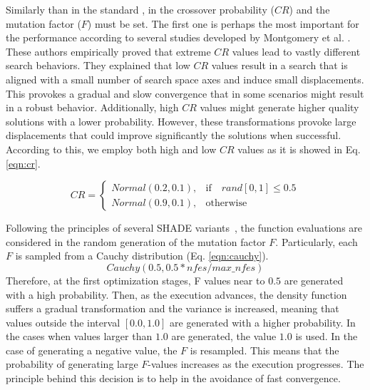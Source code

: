 %
Similarly than in the standard \DE{}, in \DEEDM{} the crossover probability ($CR$) and the mutation factor ($F$) must be set.
%
The first one is perhaps the most important for the performance according to several studies developed by Montgomery 
et al. \cite{montgomery2010analysis}.
%
These authors empirically proved that extreme $CR$ values lead to vastly different search behaviors.
%
They explained that low $CR$ values result in a search that is aligned with a small number of search space axes and
induce small displacements.
%
This provokes a gradual and slow convergence that in some scenarios might result in a robust behavior.
%
Additionally, high $CR$ values might generate higher quality solutions with a lower probability.
%
However, these transformations provoke large displacements that could improve significantly the solutions when successful.
%
According to this, we employ both high and low $CR$ values as it is showed in Eq. \ref{eqn:cr}.

\begin{equation} \label{eqn:cr}
CR = 
\begin{cases}
     Normal(0.2, 0.1),& \text{if} \quad rand[0,1] \leq 0.5  \\
     Normal(0.9, 0.1),              & \text{otherwise}
\end{cases}
\end{equation}

Following the principles of several SHADE variants~\cite{awad2016ensemble, brest2016shade}, the function evaluations are considered in the random generation of the mutation factor $F$.
%
Particularly, each $F$ is sampled from a Cauchy distribution (Eq. \ref{eqn:cauchy}).
\begin{equation}\label{eqn:cauchy}
 Cauchy(0.5, 0.5*nfes/max\_nfes)
\end{equation}
%
Therefore, at the first optimization stages, F values near to $0.5$ are generated with a high probability.
%
Then, as the execution advances, the density function suffers a gradual transformation and the variance is increased, meaning
that values outside the interval $[0.0, 1.0]$ are generated with a higher probability.
%
In the cases when values larger than $1.0$ are generated, the value $1.0$ is used.
%
In the case of generating a negative value, the $F$ is resampled.
%
This means that the probability of generating large $F$-values increases as the execution progresses.
%
The principle behind this decision is to help in the avoidance of fast convergence.


%


